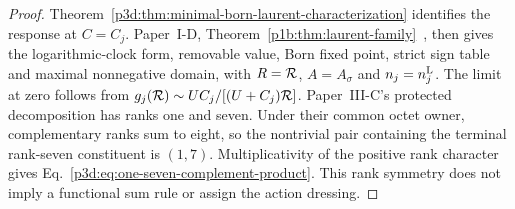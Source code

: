 \documentclass[12pt,a4paper]{article}
\begin{document}
\begin{proof}
Theorem~\ref{p3d:thm:minimal-born-laurent-characterization} identifies
the response at \(C=C_j\).  Paper~I-D,
Theorem~\ref{p1b:thm:laurent-family}~\cite{Kugelmann2026Paper1D}, then
gives the logarithmic-clock form, removable value, Born fixed point,
strict sign table and maximal nonnegative domain, with
\(R=\mathcal R\), \(A=A_\sigma\) and \(n_j=n_j^{\rm L}\).
The limit at zero follows from
\(g_j(\mathcal R)\sim UC_j/[(U+C_j)\mathcal R]\).
Paper~III-C's protected decomposition has ranks one and seven.  Under
their common octet owner, complementary ranks sum to eight, so the
nontrivial pair containing the terminal rank-seven constituent is
\((1,7)\).  Multiplicativity of the positive rank character gives
Eq.~\eqref{p3d:eq:one-seven-complement-product}.  This rank symmetry
does not imply a functional sum rule or assign the action dressing.
\end{proof}
\end{document}
